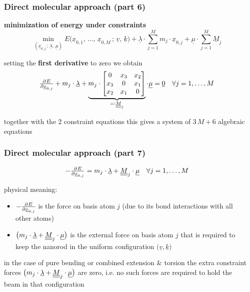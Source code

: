 \begin{frame}
  \frametitle{Direct molecular approach (part 6)}

  \textbf{minimization of energy under constraints}
  \begin{displaymath}
    \min_{(\underline{x}_{0,j} \, ; \, \underline{\lambda} , \, \underline{\mu} )} E \bigl( \underline{x}_{0,1}, \, \dots , \, \underline{x}_{0,M} \, ; \, \underline{v}, \, \underline{k} \bigr) +
    \underline{\lambda} \cdot \sum_{j=1}^M m_j \cdot \underline{x}_{0,j} +
    \underline{\mu} \cdot \sum_{j=1}^M \underline{M}_j
  \end{displaymath}
  
  \vspace{0.5em}
  setting the \textbf{first derivative} to zero we obtain
  \begin{displaymath}
    \pd{E}{\underline{x}_{0,j}} + 
    m_j \cdot \underline{\lambda} + 
    \underbrace{ m_j \cdot
    \begin{bmatrix}
      0 & x_3 & x_2 \\
      x_3 & 0 & x_1 \\
      x_2 & x_1 & 0
    \end{bmatrix} }_{=: \doubleunderline{M}_j} \cdot \underline{\mu} =
    \underline{0}
    \quad \forall j=1,\dots,M
  \end{displaymath}
  
  together with the 2 constraint equations this gives a system of $3 \, M + 6$ algebraic equations
  
  
\end{frame}


\begin{frame}
  \frametitle{Direct molecular approach (part 7)}
  \begin{displaymath}
    -\pd{E}{\underline{x}_{0,j}} = 
    m_j \cdot \underline{\lambda} + 
    \doubleunderline{M}_j \cdot \underline{\mu}
    \quad \forall j=1,\dots,M
  \end{displaymath}
  
  \vspace{0.5em}
  physical meaning:
  \begin{itemize}
    \item $-\pd{E}{\underline{x}_{0,j}}$ is the force on basis atom $j$ (due to its bond interactions with all other atoms)
    \item $\bigl( m_j \cdot \underline{\lambda} + \underline{\underline{M}}_j \cdot \underline{\mu} \bigr)$ is the external force on basis atom $j$ that is required to keep the nanorod in the uniform configuration $\bigl( \underline{v},\underline{k} \bigr)$
  \end{itemize}
  
  \vspace{0.6em}
  in the case of pure bending or combined extension \& torsion the extra constraint forces $\bigl( m_j \cdot \underline{\lambda} + \underline{\underline{M}}_j \cdot \underline{\mu} \bigr)$ are zero, i.e. no such forces are required to hold the beam in that configuration

\end{frame}


